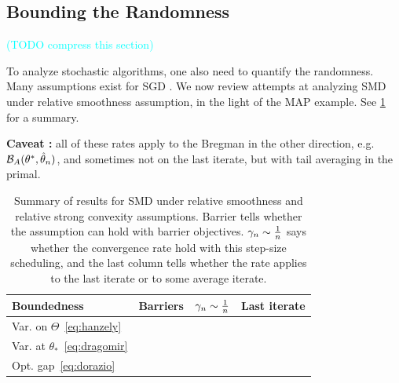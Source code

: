 \documentclass[twoside]{article}
\newcommand{\TODO}[1]{\textcolor{cyan}{(TODO #1)}}
\newcommand*{\expect}[2][]{\ensuremath{\mathbb{E}_{#1} \left[ #2 \right] }} %
\newcommand{\logpart}{A}
\newcommand{\bregman}{\cB_\logpart}
\newcommand{\nat}{\theta}
\newcommand{\m}{\mu}
\newcommand{\lr}{\gamma} %
\newcommand{\MAPt}{\hat \nat_n}
\begin{document}
\subsection{Bounding the Randomness}
\TODO{compress this section}

To analyze stochastic algorithms, one also need to quantify the randomness.
Many assumptions exist for SGD \citep[\S3 for a modern review]{khaled2020better}.
We now review attempts at analyzing SMD under relative smoothness assumption, in the light of  the MAP example.
See \cref{tbl:assumptions} for a summary.

\textbf{Caveat :} all of these rates apply to the Bregman in the other direction, e.g. $\bregman(\nat^*, \MAPt)$, and sometimes not on the last iterate, but with tail averaging in the primal.

\begin{table}[t]
\begingroup
\newcommand*{\greencmark}{\textcolor{Green}{\cmark}}
\newcommand*{\redxmark}{\textcolor{Red}{\xmark}}
\centering
\caption{Summary of results for SMD
under relative smoothness and relative strong convexity assumptions.
Barrier tells whether the assumption can hold with barrier objectives.
$\lr_n \sim \inv{n}$ says whether the convergence rate hold with this step-size scheduling, and the last column tells whether the rate applies to the last iterate or to some average iterate.
}
\begin{tabular}{lccc}
\toprule
Boundedness & Barriers &  $\lr_n \sim \inv{n}$ & Last iterate \\
\midrule
Var. on $\Theta$~\eqref{eq:hanzely} %
& \redxmark & \greencmark  & \redxmark
\\
Var. at $\theta_*$~\eqref{eq:dragomir} %
& \redxmark & \greencmark  & \greencmark
\\
Opt. gap~\eqref{eq:dorazio} %
& \greencmark & \redxmark & \greencmark
\\
\bottomrule
\end{tabular}
\label{tbl:assumptions}
\endgroup
\end{table}
\end{document}

